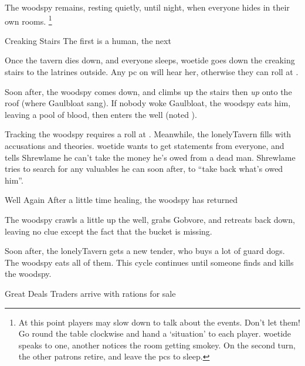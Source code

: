 \documentclass[10pt,twoside]{book}
\begin{document}

The \gls{woodspy} remains, resting quietly, until night, when everyone hides in their own rooms.%
\footnote{At this point players may slow down to talk about the events.  Don't let them!  Go round the table clockwise and hand a `situation' to each player.  \Gls{woetide} speaks to one, another notices the room getting smokey.  On the second turn, the other patrons retire, and leave the \glspl{pc} to sleep.}

{Creaking Stairs}%
{The first is a human, the next }%

Once the tavern dies down, and everyone sleeps, \gls{woetide} goes down the creaking stairs to the latrines outside.
Any \gls{pc} on  will hear her, otherwise they can roll  at \tn[12].

\setcounter{wounds}{3}
\woodspy

Soon after, the \gls{woodspy} comes down, and climbs up the stairs then \emph{up} onto the roof (where Gaulbloat sang).
If nobody woke Gaulbloat, the \gls{woodspy} eats him, leaving a pool of blood, then enters the well (noted ).

Tracking the \gls{woodspy} requires a  roll at \tn[10].
Meanwhile, the \gls{lonelyTavern} fills with accusations and theories.
\Gls{woetide} wants to get statements from everyone, and tells Shrewlame he can't take the money he's owed from a dead man.
Shrewlame tries to search for any valuables he can soon after, to ``take back what's owed him''.

{Well Again}%
{After a little time healing, the \gls{woodspy} has returned}%

The \gls{woodspy} crawls a little up the well, grabs Gobvore, and retreats back down, leaving no clue except the fact that the bucket is missing.

Soon after, the \gls{lonelyTavern} gets a new \gls{tender}, who buys a lot of guard dogs.
The \gls{woodspy} eats all of them.
This cycle continues until someone finds and kills the \gls{woodspy}.


{Great Deals}%
{Traders arrive with \glspl{ration} for sale}%
\end{document}
